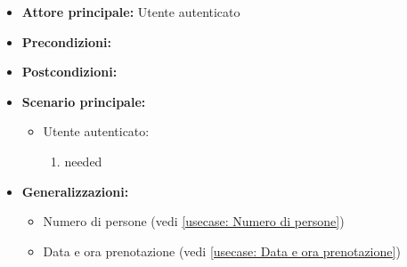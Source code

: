 \label{usecase:Prenota un tavolo}
\begin{itemize}
\item \textbf{Attore principale:}  Utente autenticato
\item \textbf{Precondizioni:}
\item \textbf{Postcondizioni:}
\item \textbf{Scenario principale:}
\begin{itemize}
\item  Utente autenticato:
\begin{enumerate}
\item needed
\end{enumerate}
\end{itemize}
\item \textbf{Generalizzazioni:}
\begin{itemize}
\item  Numero di persone (vedi \autoref{usecase: Numero di persone})
\item  Data e ora prenotazione (vedi \autoref{usecase: Data e ora prenotazione})
\end{itemize}
\end{itemize}